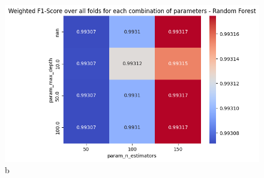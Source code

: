 \begin{figure}[H]
\begin{minipage}{\textwidth}
\begin{minipage}[c]{0.48\textwidth}
                    \includegraphics[width=\textwidth]{../figures/plots/section2/weighted_f1_score_for_each_combination_of_parameters_random_forest.png}
                    \caption{b}
                    \label{fig:b}
                \end{minipage}
            \end{minipage}

            \vspace{0.5cm}  %
            

\end{figure}
